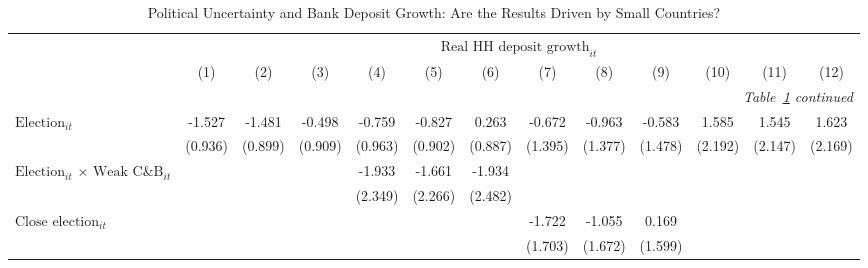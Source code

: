 \begin{longtable}{m{5cm}*{12}{c}}                                         \caption{Political Uncertainty and Bank Deposit Growth: Are the Results Driven by Small Countries?\label{robustnosmall1}}\\                                         \toprule                                         &\multicolumn{12}{c}{$\text{Real HH deposit growth}_{it}$} \\ \cmidrule(lr){2-13}
                    &         (1)   &         (2)   &         (3)   &         (4)   &         (5)   &         (6)   &         (7)   &         (8)   &         (9)   &        (10)   &        (11)   &        (12)   \\
\midrule\endfirsthead                                         \multicolumn{13}{r}{\textit{Table~\ref{robustnosmall1} continued}} \\                                         \toprule\endhead\midrule\endfoot\endlastfoot
$\text{Election}_{it}$&      -1.527   &      -1.481   &      -0.498   &      -0.759   &      -0.827   &       0.263   &      -0.672   &      -0.963   &      -0.583   &       1.585   &       1.545   &       1.623   \\
                    &     (0.936)   &     (0.899)   &     (0.909)   &     (0.963)   &     (0.902)   &     (0.887)   &     (1.395)   &     (1.377)   &     (1.478)   &     (2.192)   &     (2.147)   &     (2.169)   \\
\multirow{2}{5cm}{$\text{Election}_{it}$ $\times$ $\text{Weak C\&B}_{it}$}&               &               &               &      -1.933   &      -1.661   &      -1.934   &               &               &               &               &               &               \\
                    &               &               &               &     (2.349)   &     (2.266)   &     (2.482)   &               &               &               &               &               &               \\
\multirow{2}{5cm}{$\text{Close election}_{it}$}&               &               &               &               &               &               &      -1.722   &      -1.055   &       0.169   &               &               &               \\
                    &               &               &               &               &               &               &     (1.703)   &     (1.672)   &     (1.599)   &               &               &               \\

\end{longtable}
